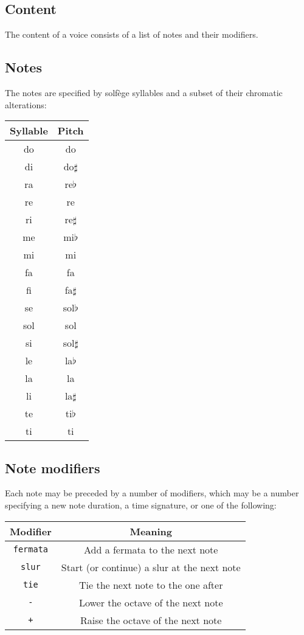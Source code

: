 \documentclass{article}
\begin{document}
\subsection{Content}

The content of a voice consists of a list of notes and their
modifiers.

\subsection{Notes}

The notes are specified by solfège syllables and a subset of their
chromatic alterations:\\

\begin{tabular}{| c | c |}

  \hline
  \textbf{Syllable} & \textbf{Pitch} \\
  \hline
  do & do\\
  di & do$\sharp$\\
  ra & re$\flat$\\
  re & re\\
  ri & re$\sharp$\\
  me & mi$\flat$\\
  mi & mi\\
  fa & fa\\
  fi & fa$\sharp$\\
  se & sol$\flat$\\
  sol & sol\\
  si & sol$\sharp$\\
  le & la$\flat$\\
  la & la\\
  li & la$\sharp$\\
  te & ti$\flat$\\
  ti & ti\\
  \hline
  
\end{tabular}

\subsection{Note modifiers}

Each note may be preceded by a number of modifiers, which may be a
number specifying a new note duration, a time signature, or one of the
following:\\

\begin{tabular}{| c | c |}

  \hline
  \textbf{Modifier} & \textbf{Meaning}\\
  \hline
  \texttt{fermata} & Add a fermata to the next note\\
  \texttt{slur} & Start (or continue) a slur at the next note\\
  \texttt{tie} & Tie the next note to the one after\\
  \texttt{-} & Lower the octave of the next note\\
  \texttt{+} & Raise the octave of the next note\\
  \hline

\end{tabular}
\end{document}
